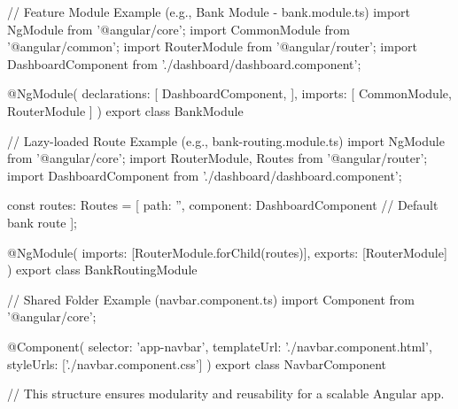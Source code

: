 // Feature Module Example (e.g., Bank Module - bank.module.ts)
import { NgModule } from '@angular/core';
import { CommonModule } from '@angular/common';
import { RouterModule } from '@angular/router';
import { DashboardComponent } from './dashboard/dashboard.component';

@NgModule({
    declarations: [
        DashboardComponent,
    ],
    imports: [
        CommonModule,
        RouterModule
    ]
})
export class BankModule { }

// Lazy-loaded Route Example (e.g., bank-routing.module.ts)
import { NgModule } from '@angular/core';
import { RouterModule, Routes } from '@angular/router';
import { DashboardComponent } from './dashboard/dashboard.component';

const routes: Routes = [
    { path: '', component: DashboardComponent } // Default bank route
];

@NgModule({
    imports: [RouterModule.forChild(routes)],
    exports: [RouterModule]
})
export class BankRoutingModule { }

// Shared Folder Example (navbar.component.ts)
import { Component } from '@angular/core';

@Component({
    selector: 'app-navbar',
    templateUrl: './navbar.component.html',
    styleUrls: ['./navbar.component.css']
})
export class NavbarComponent { }

// This structure ensures modularity and reusability for a scalable Angular app.
